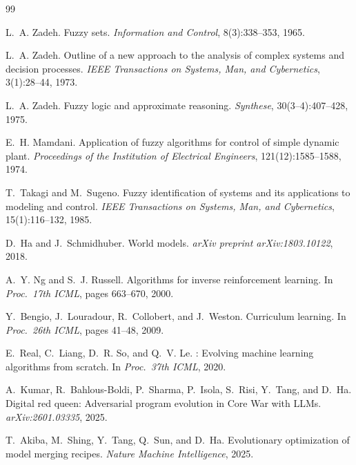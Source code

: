 \documentclass[12pt,a4paper]{article}
\begin{document}

\begin{thebibliography}{99}

L.~A. Zadeh.
\newblock Fuzzy sets.
\newblock \emph{Information and Control}, 8(3):338--353, 1965.

L.~A. Zadeh.
\newblock Outline of a new approach to the analysis of complex systems and
  decision processes.
\newblock \emph{IEEE Transactions on Systems, Man, and Cybernetics},
  3(1):28--44, 1973.

L.~A. Zadeh.
\newblock Fuzzy logic and approximate reasoning.
\newblock \emph{Synthese}, 30(3--4):407--428, 1975.

E.~H. Mamdani.
\newblock Application of fuzzy algorithms for control of simple dynamic plant.
\newblock \emph{Proceedings of the Institution of Electrical Engineers},
  121(12):1585--1588, 1974.

T.~Takagi and M.~Sugeno.
\newblock Fuzzy identification of systems and its applications to modeling and
  control.
\newblock \emph{IEEE Transactions on Systems, Man, and Cybernetics},
  15(1):116--132, 1985.

D.~Ha and J.~Schmidhuber.
\newblock World models.
\newblock \emph{arXiv preprint arXiv:1803.10122}, 2018.

A.~Y. Ng and S.~J. Russell.
\newblock Algorithms for inverse reinforcement learning.
\newblock In \emph{Proc.\ 17th ICML}, pages 663--670, 2000.

Y.~Bengio, J.~Louradour, R.~Collobert, and J.~Weston.
\newblock Curriculum learning.
\newblock In \emph{Proc.\ 26th ICML}, pages 41--48, 2009.

E.~Real, C.~Liang, D.~R. So, and Q.~V. Le.
: Evolving machine learning algorithms from scratch.
\newblock In \emph{Proc.\ 37th ICML}, 2020.

A.~Kumar, R.~Bahlous-Boldi, P.~Sharma, P.~Isola, S.~Risi, Y.~Tang, and D.~Ha.
\newblock Digital red queen: Adversarial program evolution in {C}ore {W}ar with {LLM}s.
\newblock \emph{arXiv:2601.03335}, 2025.

T.~Akiba, M.~Shing, Y.~Tang, Q.~Sun, and D.~Ha.
\newblock Evolutionary optimization of model merging recipes.
\newblock \emph{Nature Machine Intelligence}, 2025.


\end{thebibliography}
\end{document}

